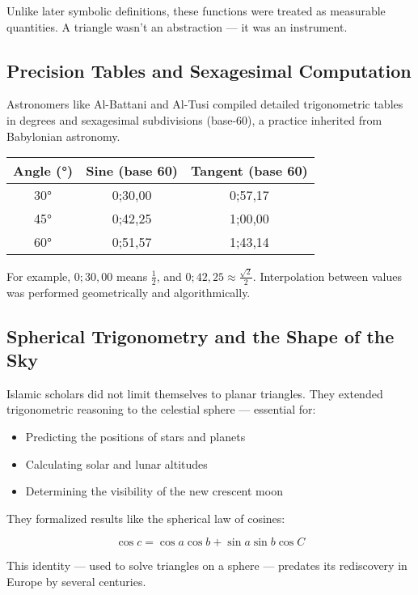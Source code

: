 Unlike later symbolic definitions, these functions were treated as measurable quantities. A triangle wasn’t an abstraction — it was an instrument.

\subsection{Precision Tables and Sexagesimal Computation}

Astronomers like Al-Battani and Al-Tusi compiled detailed trigonometric tables in degrees and sexagesimal subdivisions (base-60), a practice inherited from Babylonian astronomy.

\begin{center}
\begin{tabular}{|c|c|c|}
\hline
\textbf{Angle (°)} & \textbf{Sine (base 60)} & \textbf{Tangent (base 60)} \\
\hline
30° & 0;30,00 & 0;57,17 \\
45° & 0;42,25 & 1;00,00 \\
60° & 0;51,57 & 1;43,14 \\
\hline
\end{tabular}
\end{center}

For example, \( 0;30,00 \) means \( \frac{1}{2} \), and \( 0;42,25 \approx \frac{\sqrt{2}}{2} \). Interpolation between values was performed geometrically and algorithmically.

\subsection{Spherical Trigonometry and the Shape of the Sky}

Islamic scholars did not limit themselves to planar triangles. They extended trigonometric reasoning to the celestial sphere — essential for:

\begin{itemize}
    \item Predicting the positions of stars and planets
    \item Calculating solar and lunar altitudes
    \item Determining the visibility of the new crescent moon
\end{itemize}

They formalized results like the spherical law of cosines:

\[
\cos c = \cos a \cos b + \sin a \sin b \cos C
\]

This identity — used to solve triangles on a sphere — predates its rediscovery in Europe by several centuries.

